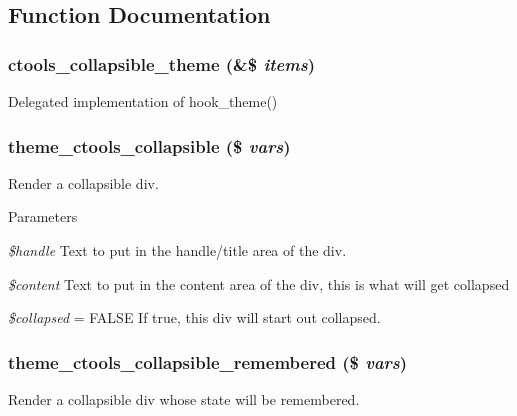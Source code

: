 \subsection{Function Documentation}
\hypertarget{collapsible_8theme_8inc_ac3cbe28b20673b0c4763aa08fcb4cdb5}{
\subsubsection[{ctools\_\-collapsible\_\-theme}]{\setlength{\rightskip}{0pt plus 5cm}ctools\_\-collapsible\_\-theme (\&\$ {\em items})}}
\label{collapsible_8theme_8inc_ac3cbe28b20673b0c4763aa08fcb4cdb5}
Delegated implementation of hook\_\-theme() \hypertarget{collapsible_8theme_8inc_ac2cacb7cc31343e4d0f076ccea68996f}{
\subsubsection[{theme\_\-ctools\_\-collapsible}]{\setlength{\rightskip}{0pt plus 5cm}theme\_\-ctools\_\-collapsible (\$ {\em vars})}}
\label{collapsible_8theme_8inc_ac2cacb7cc31343e4d0f076ccea68996f}
Render a collapsible div.


\begin{DoxyParams}{Parameters}
\item[{\em \$handle}]Text to put in the handle/title area of the div. \item[{\em \$content}]Text to put in the content area of the div, this is what will get collapsed \item[{\em \$collapsed}]= FALSE If true, this div will start out collapsed. \end{DoxyParams}
\hypertarget{collapsible_8theme_8inc_af1a9535e3223701005bc7bbde65ba870}{
\subsubsection[{theme\_\-ctools\_\-collapsible\_\-remembered}]{\setlength{\rightskip}{0pt plus 5cm}theme\_\-ctools\_\-collapsible\_\-remembered (\$ {\em vars})}}
\label{collapsible_8theme_8inc_af1a9535e3223701005bc7bbde65ba870}
Render a collapsible div whose state will be remembered.


